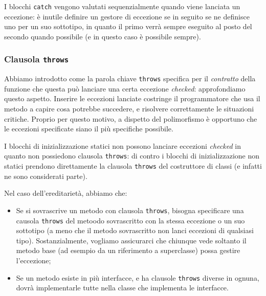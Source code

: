 \documentclass[a4paper,11pt]{article}
\begin{document}
I blocchi \lstinline|catch| vengono valutati sequenzialmente quando viene lanciata un eccezione: è inutile definire un gestore di eccezione se in seguito se ne definisce uno per un suo sottotipo, in quanto il primo verrà sempre eseguito al posto del secondo quando possibile (e in questo caso è possibile sempre).

\subsubsection{Clausola \lstinline|throws|}
Abbiamo introdotto come la parola chiave \lstinline|throws| specifica per il \textit{contratto} della funzione che questa può lanciare una certa eccezione \textit{checked}: approfondiamo questo aspetto.
Inserire le eccezioni lanciate costringe il programmatore che usa il metodo a capire cosa potrebbe succedere, e risolvere correttamente le situazioni critiche.
Proprio per questo motivo, a dispetto del polimorfismo è opportuno che le eccezioni specificate siano il più specifiche possibile.

I blocchi di inizializzazione statici non possono lanciare eccezioni \textit{checked} in quanto non possiedono clausola \lstinline|throws|: di contro i blocchi di inizializzazione non statici prendono direttamente la clausola \lstinline|throws| del costruttore di classi (e infatti ne sono considerati parte). 

Nel caso dell'ereditarietà, abbiamo che:
\begin{itemize}
	\item Se si sovrascrive un metodo con clausola \lstinline|throws|, bisogna specificare una causola \lstinline|throws| del metoodo sovrascritto con la stessa eccezione o un suo sottotipo (a meno che il metodo sovrascritto non lanci eccezioni di qualsiasi tipo). Sostanzialmente, vogliamo assicurarci che chiunque vede soltanto il metodo base (ad esempio da un riferimento a superclasse) possa gestire l'eccezione;
	\item Se un metodo esiste in più interfacce, e ha clausole \lstinline|throws| diverse in ognuna, dovrà implementarle tutte nella classe che implementa le interfacce.
\end{itemize}
\end{document}
